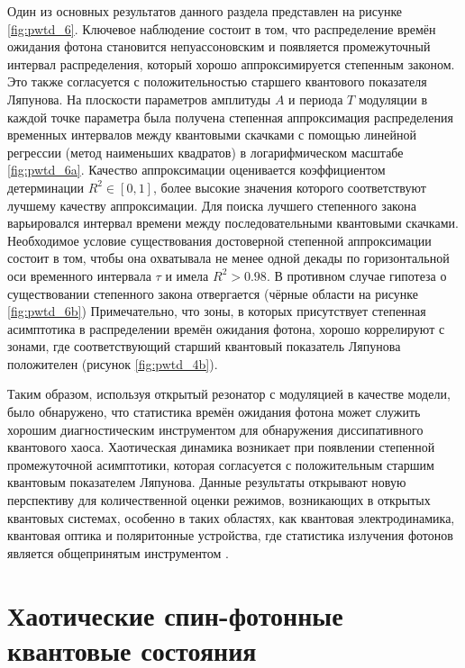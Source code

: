 Один из основных результатов данного раздела представлен на рисунке \cref{fig:pwtd_6}.
Ключевое наблюдение состоит в том, что распределение времён ожидания фотона становится непуассоновским и появляется промежуточный интервал распределения, который хорошо аппроксимируется степенным законом. Это также согласуется с положительностью старшего квантового показателя Ляпунова.
На плоскости параметров амплитуды $A$ и периода $T$ модуляции в каждой точке параметра была получена степенная аппроксимация распределения временных интервалов между квантовыми скачками с помощью линейной регрессии (метод наименьших квадратов) в логарифмическом масштабе \cref{fig:pwtd_6a}.
Качество аппроксимации оценивается коэффициентом детерминации \cite{Draper1998} $R^2 \in \left[0, 1\right]$, более высокие значения которого соответствуют лучшему качеству аппроксимации.
Для поиска лучшего степенного закона варьировался интервал времени между последовательными квантовыми скачками. Необходимое условие существования достоверной степенной аппроксимации состоит в том, чтобы она охватывала не менее одной декады по горизонтальной оси временного интервала $\tau$ и имела $R^2> 0.98$.
В противном случае гипотеза о существовании степенного закона отвергается (чёрные области на рисунке \cref{fig:pwtd_6b})  Примечательно, что зоны, в которых присутствует степенная асимптотика в распределении времён ожидания фотона, хорошо коррелируют с зонами, где соответствующий старший квантовый показатель Ляпунова положителен (рисунок \cref{fig:pwtd_4b}).

Таким образом, используя открытый резонатор с модуляцией в качестве модели, было обнаружено, что статистика времён ожидания фотона может служить хорошим диагностическим инструментом для обнаружения диссипативного квантового хаоса.
Хаотическая динамика возникает при появлении степенной промежуточной асимптотики, которая согласуется с положительным старшим квантовым показателем Ляпунова.
Данные результаты открывают новую перспективу для количественной оценки режимов, возникающих в открытых квантовых системах, особенно в таких областях, как квантовая электродинамика, квантовая оптика и поляритонные устройства, где статистика излучения фотонов является общепринятым инструментом \cite{Delteil2014, Brange2019}. 

\section{Хаотические спин-фотонные квантовые состояния}\label{sec:ch3/csp}

